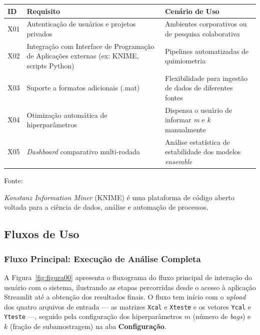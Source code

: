 \begin{quadro}[ht]
\begin{center}
\small
\captionsetup{justification=centering, labelsep=endash, width=0.75\linewidth}%
\caption{Requisitos extras para fases futuras.}
\label{tab:extras}
\begin{threeparttable}
\begin{tabularx}{\textwidth}{|l|X|X|} \hline
\textbf{ID} & \textbf{Requisito} & \textbf{Cenário de Uso} \\ \hline
X01 & Autenticação de usuários e projetos privados & Ambientes corporativos ou de pesquisa colaborativa \\ \hline
X02 & Integração com Interface de Programação de Aplicações externas (ex: KNIME\tnote{a}, scripts Python) & Pipelines automatizadas de quimiometria \\ \hline
X03 & Suporte a formatos adicionais (.mat) & Flexibilidade para ingestão de dados de diferentes fontes \\ \hline
X04 & Otimização automática de hiperparâmetros & Dispensa o usuário de informar \textit{m} e \textit{k} manualmente \\ \hline
X05 & \textit{Dashboard} comparativo multi-rodada & Análise estatística de estabilidade dos modelos \textit{ensemble} \\ \hline
\end{tabularx}
\begin{tablenotes}[flushleft]
\footnotesize
\item Fonte:~\oautor
\item[a] \textit{Konstanz Information Miner} (KNIME) \cite{knime_software_2026} é uma plataforma de código aberto voltada para a ciência de dados, análise e automação de processos.
\end{tablenotes}
\end{threeparttable}
\end{center}
\end{quadro}



\subsection{Fluxos de Uso}
\label{subsec:fluxos}

\subsubsection{Fluxo Principal: Execução de Análise Completa}
\label{ssubsec:fluxo-principal}
A Figura~\ref{fig:figura00} apresenta o fluxograma do fluxo principal de
interação do usuário com o sistema, ilustrando as etapas percorridas desde
o acesso à aplicação Streamlit até a obtenção dos resultados finais. O
fluxo tem início com o \textit{upload} dos quatro arquivos de entrada ---
as matrizes \texttt{Xcal} e \texttt{Xteste} e os vetores \texttt{Ycal} e
\texttt{Yteste} ---, seguido pela configuração dos hiperparâmetros $m$
(número de \textit{bags}) e $k$ (fração de subamostragem) na aba
\textbf{Configuração}.


